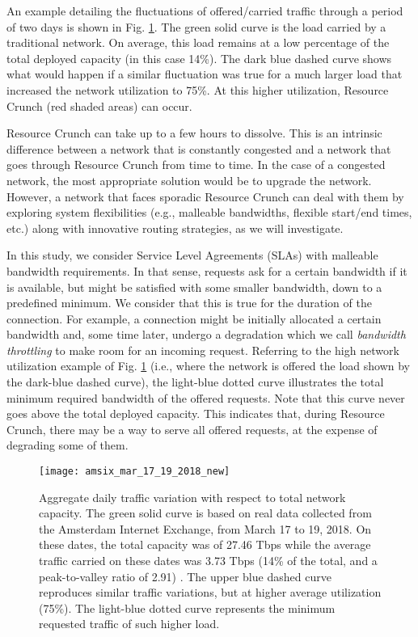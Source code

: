 \documentclass[journal]{IEEEtran}
\begin{document}
An example detailing the fluctuations of offered/carried traffic through a period of two days is shown in Fig. \ref{fig:traditional-vs-new}. The green solid curve is the load carried by a traditional network. On average, this load remains at a low percentage of the total deployed capacity (in this case 14\%). The dark blue dashed curve shows what would happen if a similar fluctuation was true for a much larger load that increased the network utilization to 75\%. At this higher utilization, Resource Crunch (red shaded areas) can occur.

Resource Crunch can take up to a few hours to dissolve. This is an intrinsic difference between a network that is constantly congested and a network that goes through Resource Crunch from time to time. In the case of a congested network, the most appropriate solution would be to upgrade the network. However, a network that faces sporadic Resource Crunch can deal with them by exploring system flexibilities (e.g., malleable bandwidths, flexible start/end times, etc.) along with innovative routing strategies, as we will investigate. 

In this study, we consider Service Level Agreements (SLAs) with malleable bandwidth requirements. In that sense, requests ask for a certain bandwidth if it is available, but might be satisfied with some smaller bandwidth, down to a predefined minimum. We consider that this is true for the duration of the connection. For example, a connection might be initially allocated a certain bandwidth and, some time later, undergo a degradation which we call \textit{bandwidth throttling} to make room for an incoming request. Referring to the high network utilization example of Fig. \ref{fig:traditional-vs-new} (i.e., where the network is offered the load shown by the dark-blue dashed curve), the light-blue dotted curve illustrates the total minimum required bandwidth of the offered requests. Note that this curve never goes above the total deployed capacity. This indicates that, during Resource Crunch, there may be a way to serve all offered requests, at the expense of degrading some of them.

\begin{figure}
 \centering
 \texttt{[image: amsix\_mar\_17\_19\_2018\_new]}
 \caption{
 Aggregate daily traffic variation with respect to total network capacity. The green solid curve is based on real data collected from the Amsterdam Internet Exchange, from March 17 to 19, 2018. On these dates, the total capacity was of 27.46 Tbps while the average traffic carried on these dates was 3.73 Tbps (14\% of the total, and a peak-to-valley ratio of 2.91) \cite{amsix}. The upper blue dashed curve reproduces similar traffic variations, but at higher average utilization (75\%). The light-blue dotted curve represents the minimum requested traffic of such higher load.}	\label{fig:traditional-vs-new}
\end{figure} 
\end{document}
